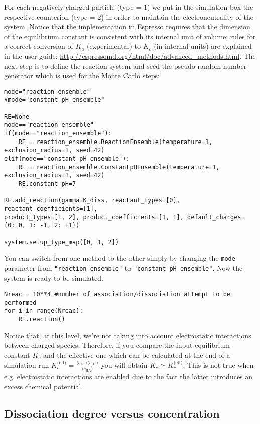 \documentclass[
a4paper,                        %
11pt,                           %
twoside,                        %
footsepline,                    %
headsepline,                    %
headexclude,                    %
footexclude,                    %
pagesize,                       %
]{scrartcl}
\begin{document}
For each negatively charged  particle (type = 1) we put in the simulation box the respective counterion  (type = 2) in order to maintain the electroneutrality of the system.
Notice that the implementation in Espresso requires that the dimension of the equilibrium constant is consistent with its internal unit of volume; rules for a correct conversion of $K_a$ (experimental) to $K_c$ (in internal units) are explained in the user guide: \url{http://espressomd.org/html/doc/advanced_methods.html}. The next step is to define the reaction system and seed the pseudo random number generator which is used for the Monte Carlo steps:

\begin{verbatim}
mode="reaction_ensemble"
#mode="constant_pH_ensemble"

RE=None
mode=="reaction_ensemble"
if(mode=="reaction_ensemble"):
    RE = reaction_ensemble.ReactionEnsemble(temperature=1, exclusion_radius=1, seed=42)
elif(mode=="constant_pH_ensemble"):
    RE = reaction_ensemble.ConstantpHEnsemble(temperature=1, exclusion_radius=1, seed=42)
    RE.constant_pH=7
    
RE.add_reaction(gamma=K_diss, reactant_types=[0], reactant_coefficients=[1], 
product_types=[1, 2], product_coefficients=[1, 1], default_charges=
{0: 0, 1: -1, 2: +1})

system.setup_type_map([0, 1, 2])
\end{verbatim}
You can switch from one method to the other simply by changing the \texttt{mode} parameter from \texttt{"reaction\_ensemble"} to \texttt{"constant\_pH\_ensemble"}. Now the system is ready to be simulated.

\begin{verbatim}
Nreac = 10**4 #number of association/dissociation attempt to be performed
for i in range(Nreac):
    RE.reaction()
\end{verbatim}
Notice that, at this level, we're not taking into account electrostatic interactions between charged species. Therefore, if you compare the input equilibrium constant $K_c$ and the effective one which can be calculated at the end of a simulation run $K_c^{\text{(eff)}} = \frac{\langle c_{\text{A}^-} \rangle \langle c_{\text{H}^+} \rangle }{\langle c_\text{HA} \rangle}$ you will obtain $K_c \simeq K_c^\text{(eff)}$. This is not true when e.g. electrostatic interactions are enabled due to the fact the latter introduces an excess chemical potential.


\subsection{Dissociation degree versus concentration}
\end{document}
